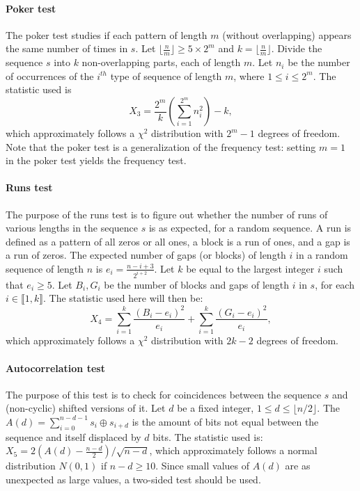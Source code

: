 \documentclass[10pt, a4paper, conference, compsocconf]{IEEEtran}
\begin{document}
\paragraph{Poker test}
The poker test studies if each pattern of length $m$ (without overlapping) appears the same number of times in $s$. Let $\lfloor \frac{n}{m} \rfloor\geqslant 5 \times 2^m$ and $k= \lfloor \frac{n}{m} \rfloor $. Divide the sequence $s$ into $k$ non-overlapping parts, each of length $m$. Let $n_i$ be the number of occurrences of the $i^{th}$ type of sequence of length $m$, where $1 \leqslant i \leqslant 2^m$. The statistic used is 
\begin{equation*}
X_3=\dfrac{2^m}{k}\left(\displaystyle{\sum^{2^m}_{i=1}n^2_i}\right)-k,
\end{equation*}
which approximately follows a $\chi^2$ distribution with $2^m-1$ degrees of freedom. Note that the poker test is a generalization of the frequency test: setting $m = 1$ in the poker test yields the frequency test.

\paragraph{Runs test}
The purpose of the runs test is to figure out whether the number of runs of various lengths in the sequence $s$ is as expected, for a random sequence. A run is defined as a pattern of all zeros or all ones, a block is a run of ones, and a gap is a run of zeros. The expected number of gaps (or blocks) of length $i$ in a random sequence of length $n$ is $e_i = \frac{n-i+3}{2^{i+2}}$. Let $k$ be equal to the largest integer $i$ such that $e_i \geqslant 5$. Let
$B_i , G_i$ be the number of blocks and gaps of length $i$ in $s$, for each $i \in \llbracket 1, k\rrbracket$. The statistic used here will then be:
\begin{equation*}
\displaystyle{X_4=\sum^k_{i=1}\frac{(B_i-e_i)^2}{e_i}+\sum^k_{i=1}\frac{(G_i-e_i)^2}{e_i}},
\end{equation*}
\noindent which approximately follows a $\chi^2$ distribution with $2k - 2$ degrees of freedom.

\paragraph{Autocorrelation test}
The purpose of this test is to check for coincidences between the sequence $s$ and (non-cyclic) shifted versions of it. Let $d$ be a fixed integer, $ 1 \leqslant d \leqslant \lfloor n/2 \rfloor$. The  $A(d) = \sum_{i=0}^{n-d-1} s_i\oplus s_{i+d}$ is the amount of bits not equal between the sequence and itself displaced by $d$ bits. The statistic used is:
$X_5=2(A(d)-\frac{n-d}{2})/\sqrt{n-d}$,
which approximately follows a normal distribution $N(0, 1)$ if $n-d \geqslant 10$. Since small values of $A(d)$ are as unexpected as large values, a two-sided test should be used.
\end{document}
